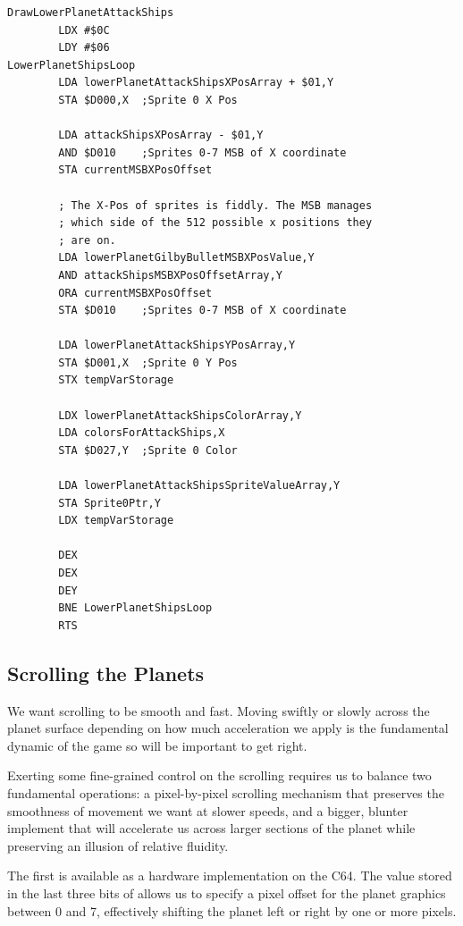 \begin{minipage}[b]{0.55\linewidth}
\centering
\begin{lstlisting}[basicstyle=\tiny]
DrawLowerPlanetAttackShips
        LDX #$0C
        LDY #$06
LowerPlanetShipsLoop   
        LDA lowerPlanetAttackShipsXPosArray + $01,Y
        STA $D000,X  ;Sprite 0 X Pos

        LDA attackShipsXPosArray - $01,Y
        AND $D010    ;Sprites 0-7 MSB of X coordinate
        STA currentMSBXPosOffset

        ; The X-Pos of sprites is fiddly. The MSB manages
        ; which side of the 512 possible x positions they
        ; are on.
        LDA lowerPlanetGilbyBulletMSBXPosValue,Y
        AND attackShipsMSBXPosOffsetArray,Y
        ORA currentMSBXPosOffset
        STA $D010    ;Sprites 0-7 MSB of X coordinate

        LDA lowerPlanetAttackShipsYPosArray,Y
        STA $D001,X  ;Sprite 0 Y Pos
        STX tempVarStorage

        LDX lowerPlanetAttackShipsColorArray,Y
        LDA colorsForAttackShips,X
        STA $D027,Y  ;Sprite 0 Color

        LDA lowerPlanetAttackShipsSpriteValueArray,Y
        STA Sprite0Ptr,Y
        LDX tempVarStorage

        DEX
        DEX
        DEY
        BNE LowerPlanetShipsLoop
        RTS
\end{lstlisting}
\end{minipage}

\subsection{Scrolling the Planets}
We want scrolling to be smooth and fast. Moving swiftly or slowly across the planet surface
depending on how much acceleration we apply is the fundamental dynamic of the game so will
be important to get right.

Exerting some fine-grained control on the scrolling requires us to balance
two fundamental operations: a pixel-by-pixel scrolling mechanism that preserves the smoothness
of movement we want at slower speeds, and a bigger, blunter implement that will accelerate
us across larger sections of the planet while preserving an illusion of relative fluidity.

The first is available as a hardware implementation on the C64. The value stored in the last
three bits of  allows us to specify a pixel offset for the planet graphics between
0 and 7, effectively shifting the planet left or right by one or more pixels.

